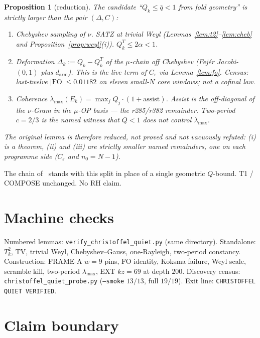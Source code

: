 \documentclass[11pt]{article}
\newtheorem{prop}{Proposition}
\theoremstyle{remark}
\begin{document}
\begin{prop}[reduction]\label{prop:red}
The candidate ``$Q_k\le\bar q<1$ from fold geometry'' is
strictly larger than the pair $(\Delta,C)$:
\begin{enumerate}
\item \emph{Chebyshev sampling of $\nu$.}  SATZ at trivial Weyl
  (Lemmas~\ref{lem:t2}--\ref{lem:cheb} and
  Proposition~\ref{prop:weyl}(i)).  $Q_k^T\le 2\alpha<1$.
\item \emph{Deformation}
  $\Delta_k:=Q_k-Q_k^T$
  of the $\mu$-chain off Chebyshev (Fej\'er Jacobi-$(0,1)$ plus
  $d_{\mathrm{arm}}$).  This is the live term of $C_\varepsilon$
  via Lemma~\ref{lem:fo}.  Census: last-twelve
  $\lvert\mathrm{FO}\rvert\le 0.01182$ on eleven small-$N$
  core windows; not a cofinal law.
\item \emph{Coherence}
  $\lambda_{\max}(E_k)=\max_j Q_j\cdot(1+\mathrm{assist})$.
  Assist is the off-diagonal of the $\nu$-Gram in the $\mu$-OP
  basis --- the r285/r382 remainder.  Two-period $c=2/3$ is the
  named witness that $Q<1$ does not control $\lambda_{\max}$.
\end{enumerate}
The original lemma is therefore reduced, not proved and not
vacuously refuted: (i) is a theorem, (ii) and (iii) are strictly
smaller named remainders, one on each programme side
($C_\varepsilon$ and $n_0=N-1$).
\end{prop}

The chain of~\cite{v3p,r381,r382} stands with this split in
place of a single geometric $Q$-bound.  T1 / COMPOSE unchanged.
No RH claim.

\section{Machine checks}\label{sec:machine}

Numbered lemmas: \texttt{verify\_christoffel\_quiet.py}
(same directory).  Standalone: $T_k^2$, TV, trivial Weyl,
Chebyshev--Gauss, one-Rayleigh, two-period constancy.
Construction: FRAME-A $w=9$ pins, FO identity, Koksma failure,
Weyl scale, scramble kill, two-period $\lambda_{\max}$,
EXT $kz=69$ at depth $200$.
Discovery census: \texttt{christoffel\_quiet\_probe.py}
(\texttt{--smoke} $13/13$, full $19/19$).
Exit line: \texttt{CHRISTOFFEL QUIET VERIFIED}.

\section*{Claim boundary}
\end{document}
